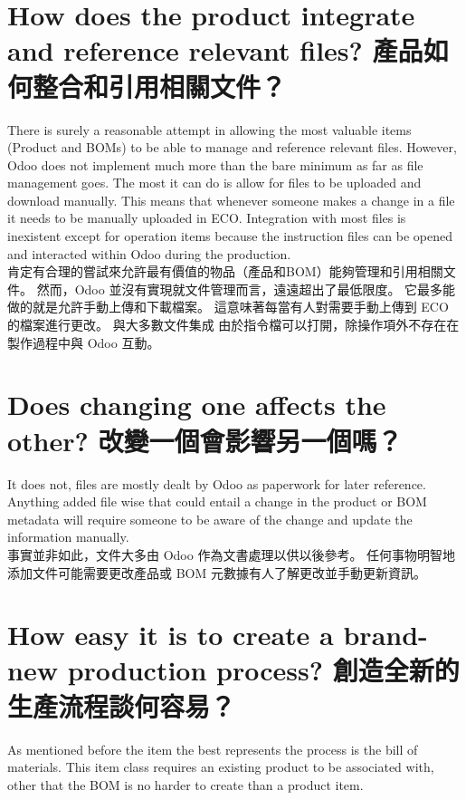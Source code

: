 \section{How does the product integrate and reference relevant files? 產品如何整合和引用相關文件？}
\fontsize{12pt}{2.5pt}\selectfont 
{There is surely a reasonable attempt in allowing the most valuable items (Product and BOMs) to be able to manage and reference relevant files. However, Odoo does not implement much more than the bare minimum as far as file management goes. The most it can do is allow for files to be uploaded and download manually. This means that whenever someone makes a change in a file it needs to be manually uploaded in ECO. Integration with most files is inexistent except for operation items because the instruction files can be opened and interacted within Odoo during the production. }\\[1pt]

\fontsize{12pt}{2.5pt}\selectfont
{肯定有合理的嘗試來允許最有價值的物品（產品和BOM）能夠管理和引用相關文件。 然而，Odoo 並沒有實現就文件管理而言，遠遠超出了最低限度。 它最多能做的就是允許手動上傳和下載檔案。 這意味著每當有人對需要手動上傳到 ECO 的檔案進行更改。 與大多數文件集成
由於指令檔可以打開，除操作項外不存在在製作過程中與 Odoo 互動。}\\[1pt]

\section{Does changing one affects the other? 改變一個會影響另一個嗎？}
\fontsize{12pt}{2.5pt}\selectfont 
{It does not, files are mostly dealt by Odoo as paperwork for later reference. Anything added file wise that could entail a change in the product or BOM metadata will require someone to be aware of the change and update the information manually.}\\[1pt]

\fontsize{12pt}{2.5pt}\selectfont
{事實並非如此，文件大多由 Odoo 作為文書處理以供以後參考。 任何事物明智地添加文件可能需要更改產品或 BOM 元數據有人了解更改並手動更新資訊。}\\[1pt]

\section{How easy it is to create a brand-new production process? 創造全新的生產流程談何容易？}
\fontsize{12pt}{2.5pt}\selectfont 
{As mentioned before the item the best represents the process is the bill of materials. This item class requires an existing product to be associated with, other that the BOM is no harder to create than a product item.}\\[1pt]

